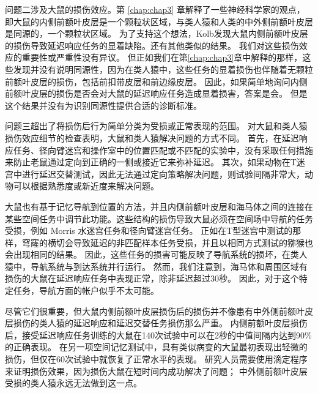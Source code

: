 问题二涉及大鼠的损伤效应。第 \ref{chap:chap3} 章解释了一些神经科学家的观点，即大鼠的内侧前额叶皮层是一个颗粒状区域，与类人猿和人类的中外侧前额叶皮层是同源的，一个颗粒状区域。
为了支持这个想法，Kolb\cite{kolb1994dissociation}发现大鼠内侧前额叶皮层的损伤导致延迟响应任务的显着缺陷。还有其他类似的结果。
我们对这些损伤效应的重要性或严重性没有异议。
但正如我们在第\ref{chap:chap3}章中解释的那样，这些发现并没有说明同源性，因为在类人猿中，这些任务的显着损伤也伴随着无颗粒前额叶皮层的损伤，包括前扣带皮层和前边缘皮层\cite{meunier1997effects,rushworth2003effect}。
因此，如果简单地询问内侧前额叶皮层的损伤是否会对大鼠的延迟响应任务造成显着损害，答案是会。
但是这个结果并没有为识别同源性提供合适的诊断标准。
\par


问题三超出了将损伤后行为简单分类为受损或正常表现的范围。
对大鼠和类人猿损伤效应细节的检查表明，大鼠和类人猿解决问题的方式不同。
首先，在延迟响应任务\cite{kolb1974double}、径向臂迷宫\cite{kesner1989retrospective}和操作室中的位置匹配或不匹配\cite{sloan2006hippocampal}的实验中，没有采取任何措施来防止老鼠通过定向到正确的一侧或接近它来弥补延迟。
其次，如果动物在T迷宫中进行延迟交替测试，因此无法通过定向策略解决问题，则试验间隔非常大，动物可以根据熟悉度或新近度来解决问题\cite{sanderson2010spatial}。
\par


大鼠也有基于记忆导航到位置的方法\cite{kolb1994dissociation}，并且内侧前额叶皮层和海马体之间的连接在某些空间任务中调节此功能。这些结构的损伤导致大鼠必须在空间场中导航的任务受损，例如 Morris 水迷宫任务和径向臂迷宫任务\cite{kolb1994dissociation}。
正如在T型迷宫中测试的那样\cite{markowska1989comparative}，穹窿的横切会导致延迟的非匹配样本任务受损，并且以相同方式测试的猕猴也会出现相同的结果\cite{murray1989effects}。
因此，这些任务的损害可能反映了导航系统的损坏，在类人猿中，导航系统与到达系统并行运行。
然而，我们注意到，海马体和周围区域有损伤的大鼠在延迟响应任务中表现正常，除非延迟超过30秒\cite{alvarez1994animal}。
因此，对于这个特定任务，导航方面的帐户似乎不太可能。
\par


尽管它们很重要，但大鼠内侧前额叶皮层损伤后的损伤并不像患有中外侧前额叶皮层损伤的类人猿的延迟响应和延迟交替任务损伤那么严重。
内侧前额叶皮层损伤后，接受延迟响应任务训练的大鼠在140次试验中可以在2秒的中值间隔内达到90$\%$的正确表现\cite{kolb1994dissociation}。
在另一项空间记忆测试中，具有类似病变的大鼠最初表现出轻微的损伤，但仅在60次试验中就恢复了正常水平的表现\cite{kolb1974double}。
研究人员需要使用滴定程序来证明损伤效果，因为损伤大鼠在短时间内成功解决了问题\cite{kolb1994dissociation}；
中外侧前额叶皮层受损的类人猿永远无法做到这一点。
\par


